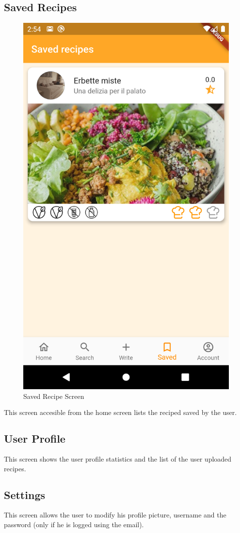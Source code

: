 \subsection{Saved Recipes}
\begin{figure}[H]
	\centering
	\includegraphics[width = .3\linewidth]{img/Saved.png}
	\caption{Saved Recipe Screen}
\end{figure}
This screen accesible from the home screen lists the reciped saved by the user.
\subsection{User Profile}
This screen shows the user profile statistics and the list of the user uploaded recipes.
\subsection{Settings}
This screen allows the user to modify his profile picture, username and the password (only if he is logged using the email).